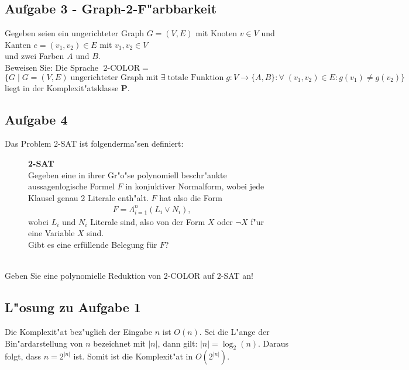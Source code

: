 \documentclass[10pt,oneside,onecolumn,a4paper,german,titlepage]{article}
\begin{document}
\subsection*{Aufgabe 3 - Graph-2-F"arbbarkeit}
Gegeben seien ein ungerichteter Graph $G = (V,E)$ mit Knoten $v \in V$ und
Kanten $e = (v_1,v_2) \in E$ mit $v_1, v_2 \in V$\\ und zwei Farben $A$ und $B$.\\
Beweisen Sie: Die Sprache $\mbox{2-COLOR} \; =$\\
$\{G \; | \; G = (V,E) \; \mbox{ungerichteter Graph mit} \; \exists \; \mbox{totale
Funktion} \; g: V \to \{A,B\}: \forall \; (v_1, v_2) \in E: g(v_1) \neq g(v_2)\}$\\
liegt in der Komplexit"atsklasse \textbf{P}.

\subsection*{Aufgabe 4}
Das Problem 2-SAT ist folgenderma"sen definiert:\\
\begin{figure}[ht]
\vbox{\small
\textbf{2-SAT}\\
Gegeben eine in ihrer Gr"o"se polynomiell beschr"ankte aussagenlogische Formel $F$
in konjuktiver Normalform, wobei jede Klausel genau 2 Literale enth"alt. $F$ hat
also die Form
\begin{eqnarray*}F = \Lambda_{i = 1}^n (L_i \vee N_i),\end{eqnarray*}
wobei $L_i$ und $N_i$ Literale sind, also von der Form $X$ oder $\neg X$ f"ur eine
Variable $X$ sind.\\
Gibt es eine erfüllende Belegung für $F$?
}
\centerline{}
\end{figure}\\
Geben Sie eine polynomielle Reduktion von 2-COLOR auf 2-SAT an!

\newpage

\subsection*{L"osung zu Aufgabe 1}
Die Komplexit"at bez"uglich der Eingabe $n$ ist $O(n)$. Sei die L"ange der
Bin"ardarstellung von $n$ bezeichnet mit $|n|$, dann gilt: $|n| = \log_2(n)$.
Daraus folgt, dass $n = 2^{|n|}$ ist. Somit ist die Komplexit"at in $O(2^{|n|})$.
\end{document}
